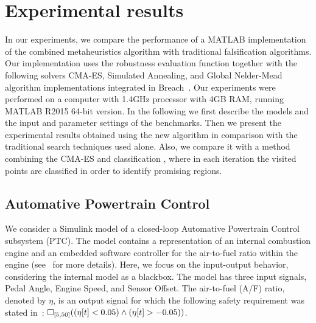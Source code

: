 \section{Experimental results}\label{sec:expres}

In our experiments, we compare the performance of a MATLAB
implementation of the combined metaheuristics algorithm with traditional falsification algorithms. Our implementation uses
the robustness evaluation function together with the following solvers CMA-ES, Simulated Annealing, and Global
Nelder-Mead algorithm implementations integrated in
Breach~\cite{DBLP:conf/cav/Donze10}. 
Our experiments were performed on a computer with 1.4GHz processor with 4GB RAM, running 
MATLAB R2015 64-bit version. 
In the following we first describe the models and the input and parameter settings of the benchmarks. Then we present the experimental results obtained using the new algorithm in comparison with the traditional search techniques used alone. Also, we compare it with a method combining
the CMA-ES and classification \cite{CAV2017}, where in each iteration the visited points are classified in order to identify promising regions.


\subsection{Automative Powertrain Control} \label{sec:PTC}
We consider a Simulink model of a closed-loop Automative Powertrain Control
subsystem (PTC). The model contains a representation of an internal combustion engine and an
embedded software controller for the air-to-fuel ratio within the
engine (see~\cite{Dreossi2015} for more details). Here, we
focus on the input-output behavior, considering the
internal model as a blackbox. The model has three input signals,
Pedal Angle, Engine Speed, and Sensor Offset.
The air-to-fuel (A/F) ratio, denoted by $\eta$, is an
output signal for which the following safety requirement was stated
in~\cite{Dreossi2015}: %
$\Box_{[5,50]}( (\eta[t] < 0.05) \land ( \eta[t] > - 0.05 ))$.

